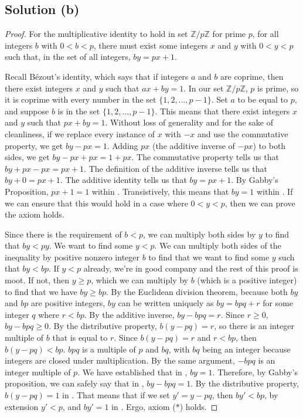 \documentclass[11pt]{article}
\begin{document}
    \subsection{Solution (b)}
    \begin{proof}
        For the multiplicative identity to hold in set $\mathbb{Z}/p\mathbb{Z}$ for prime $p$, for all integers $b$ with $0 < b < p$, there must exist some integers $x$ and $y$ with $0 < y < p$ such that, in the set of all integers, $by = px + 1$.

        Recall B\'ezout's identity, which says that if integers $a$ and $b$ are coprime, then there exist integers $x$ and $y$ such that $ax + by = 1$.
        In our set $\mathbb{Z}/p\mathbb{Z}$, $p$ is prime, so it is coprime with every number in the set $\{1, 2, \dots, p - 1\}$.
        Set $a$ to be equal to $p$, and suppose $b$ is in the set $\{1, 2, \dots, p - 1\}$.
        This means that there exist integers $x$ and $y$ such that $px + by = 1$.
        Without loss of generality and for the sake of cleanliness, if we replace every instance of $x$ with $-x$ and use the commutative property, we get $by - px = 1$.
        Adding $px$ (the additive inverse of $-px$) to both sides, we get $by - px + px = 1 + px$.
        The commutative property tells us that $by + px - px = px + 1$.
        The definition of the additive inverse tells us that $by + 0 = px + 1$.
        The additive identity tells us that $by = px + 1$.
        By Gabby's Proposition, $px + 1 = 1$ within .
        Transistively, this means that $by = 1$ within .
        If we can ensure that this would hold in a case where $0 < y < p$, then we can prove the axiom holds.

        Since there is the requirement of $b < p$, we can multiply both sides by $y$ to find that $by < py$.
        We want to find some $y < p$. 
        We can multiply both sides of the inequality by positive nonzero integer $b$ to find that we want to find some $y$ such that $by < bp$.
        If $y < p$ already, we're in good company and the rest of this proof is moot.
        If not, then $y \geq p$, which we can multiply by $b$ (which is a positive integer) to find that we have $by \geq bp$.
        By the Euclidean division theorem, because both $by$ and $bp$ are positive integers, $by$ can be written uniquely as $by = bp q + r$ for some integer $q$ where $r < bp$.
        By the additive inverse, $by - bp q = r$.
        Since $r \geq 0$, $by - bp q \geq 0$.
        By the distributive property, $b(y - pq) = r$, so there is an integer multiple of $b$ that is equal to $r$.
        Since $b(y - pq) = r$ and $r < bp$, then $b(y - pq) < bp$.
        $bpq$ is a multiple of $p$ and $bq$, with $bq$ being an integer because integers are closed under multiplication.
        By the same argument, $-bpq$ is an integer multiple of $p$.
        We have established that in , $by = 1$.
        Therefore, by Gabby's proposition, we can safely say that in , $by - bpq = 1$.
        By the distributive property, $b(y - pq) = 1$ in .
        That means that if we set $y' = y - pq$, then $by' < bp$, by extension $y' < p$, and $by' = 1$ in .
        Ergo, axiom ($\ast$) holds.
    \end{proof}
\end{document}
